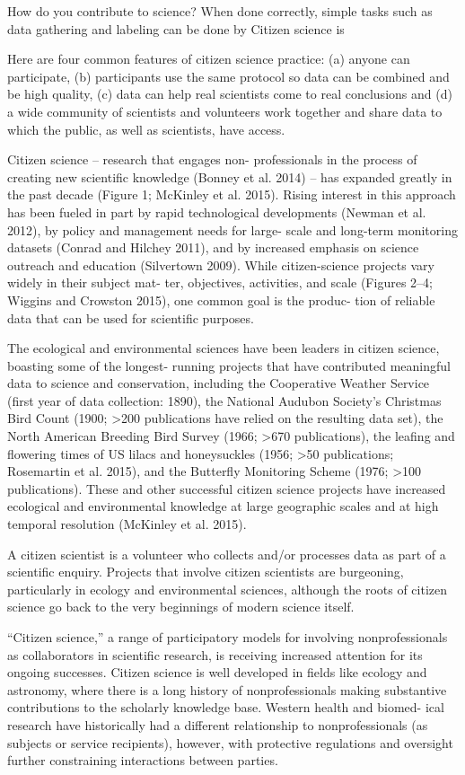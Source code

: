 How do you contribute to science?
When done correctly, simple tasks such as data gathering and labeling can be done by
Citizen science is 


Here are four common features of citizen science practice: (a) anyone can participate, (b) participants use the same protocol so data can be combined and be high quality, (c) data can help real scientists come to real conclusions and (d) a wide community of scientists and volunteers work together and share data to which the public, as well as scientists, have access. 


Citizen science – research that engages non- professionals in the process of creating new scientific knowledge (Bonney et al. 2014) – has expanded greatly in the past decade (Figure 1; McKinley et al. 2015). Rising interest in this approach has been fueled in part by rapid technological developments (Newman et al. 2012), by policy and management needs for large- scale and long-term monitoring datasets (Conrad and Hilchey 2011), and by increased emphasis on science outreach and education (Silvertown 2009). While citizen-science projects vary widely in their subject mat- ter, objectives, activities, and scale (Figures 2–4; Wiggins and Crowston 2015), one common goal is the produc- tion of reliable data that can be used for scientific purposes.

The ecological and environmental sciences have been leaders in citizen science, boasting some of the longest- running projects that have contributed meaningful data to science and conservation, including the Cooperative Weather Service (first year of data collection: 1890), the National Audubon Society’s Christmas Bird Count (1900; >200 publications have relied on the resulting data set), the North American Breeding Bird Survey (1966; >670 publications), the leafing and flowering times of US lilacs and honeysuckles (1956; >50 publications; Rosemartin et al. 2015), and the Butterfly Monitoring Scheme (1976; >100 publications). These and other successful citizen science projects have increased ecological and environmental knowledge at large geographic scales and at high temporal resolution (McKinley et al. 2015).

A citizen scientist is a volunteer who collects and/or processes data as part of a scientific enquiry. Projects that involve citizen scientists are burgeoning, particularly in ecology and environmental sciences, although the roots of citizen science go back to the very beginnings of modern science itself.

“Citizen science,” a range of participatory models for involving nonprofessionals as collaborators in scientific research, is receiving increased attention for its ongoing successes. Citizen science is well developed in fields like ecology and astronomy, where there is a long history of nonprofessionals making substantive contributions to the scholarly knowledge base. Western health and biomed- ical research have historically had a different relationship to nonprofessionals (as subjects or service recipients), however, with protective regulations and oversight further constraining interactions between parties. 


